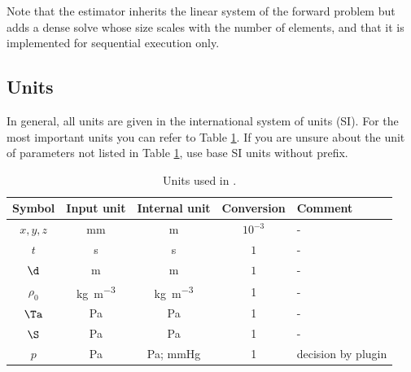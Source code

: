 Note that the estimator inherits the linear system of the forward problem but adds a dense solve whose size scales with the number of elements, and that it is implemented for sequential execution only.


\subsection{Units}

In general, all units are given in the international system of units (SI).
For the most important units you can refer to Table \ref{tab:units}.
If you are unsure about the unit of parameters not listed in Table \ref{tab:units}, use base SI units without prefix.

\begin{table}[h!]
    \centering
    \caption{Units used in \CM.}
    \label{tab:units}
    \begin{tabular}{ccccl}
        \toprule
        Symbol  & Input unit & Internal unit & Conversion & Comment \\
        \midrule
         $x,y,z$ & \si{mm} & \si{m} & $10^{-3}$ & -\\
         $t$ & \si{s} & \si{s} & $1$ & -\\
         $\d$ & \si{m} & \si{m} & $1$ & -\\
         $\rho_0$ & \si{\kilo\gram\per\meter\cubed} & \si{\kilo\gram\per\meter\cubed} & 1 & -\\
         $\Ta$ & \si{\pascal} & \si{\pascal} & 1 & -\\
         $\S$ & \si{\pascal} & \si{\pascal} & 1 & -\\
         $p$ & \si{\pascal} & \si{\pascal}; \si{mmHg} & 1 & decision by plugin\\
         \bottomrule
    \end{tabular}
\end{table}


